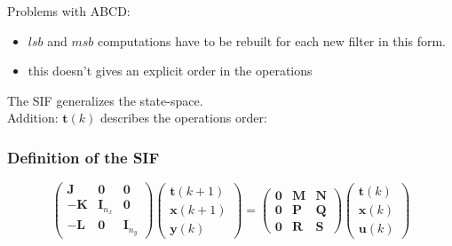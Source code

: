 \begin{frame}
	Problems with ABCD:
	\begin{itemize}
		\item $lsb$ and $msb$ computations have to be rebuilt for each new filter in this form.
		\item this doesn't gives an explicit order in the operations
	\end{itemize}

	The SIF generalizes the state-space.\\
	Addition: $\boldsymbol{t}(k)$ describes the operations order:

	\frametitle{Definition of the SIF}
	\begin{equation} \label{sifdef}
		\begin{pmatrix}
			\boldsymbol{J} & \boldsymbol{0} & \boldsymbol{0} \\
			\boldsymbol{-K} & \boldsymbol{I}_{n_x} & \boldsymbol{0} \\
			\boldsymbol{-L} & \boldsymbol{0} & \boldsymbol{I}_{n_y} 
		\end{pmatrix}
		\begin{pmatrix}
			\boldsymbol{t} (k+1)  \\
			\boldsymbol{x} (k+1)  \\
			\boldsymbol{y} (k) 
		\end{pmatrix}
		=
		\begin{pmatrix}
			\boldsymbol{0} & \boldsymbol{M} & \boldsymbol{N} \\
			\boldsymbol{0} & \boldsymbol{P} & \boldsymbol{Q} \\
			\boldsymbol{0} & \boldsymbol{R} & \boldsymbol{S} 
		\end{pmatrix}
		\begin{pmatrix}
			\boldsymbol{t} (k)  \\
			\boldsymbol{x} (k)  \\
			\boldsymbol{u} (k) 
		\end{pmatrix}
	\end{equation}

\end{frame}

